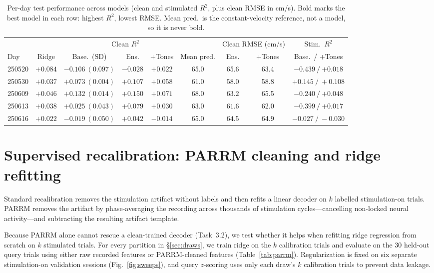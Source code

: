 \documentclass{article}
\begin{document}
\begin{table}[htbp]\centering
\caption{Per-day test performance across models (clean and stimulated $R^2$, plus clean RMSE in cm/s). Bold marks the best model in each row: highest $R^2$, lowest RMSE. Mean pred.\ is the constant-velocity reference, not a model, so it is never bold.}
\scriptsize
\setlength{\tabcolsep}{3pt}
\begin{tabular}{@{}lcccccccc@{}}\toprule
 & \multicolumn{5}{c}{Clean $R^2$} & \multicolumn{2}{c}{Clean RMSE (cm/s)} & Stim.\ $R^2$ \\
\cmidrule(lr){2-6}\cmidrule(lr){7-8}\cmidrule(lr){9-9}
Day & Ridge & Base.\ (SD) & Ens. & +Tones & Mean pred. & Ens. & +Tones & Base.\ / +Tones \\ \midrule
250520 & $\mathbf{+0.084}$ & $-0.106\ (0.097)$ & $-0.028$ & $+0.022$ & 65.0 & 65.6 & $\mathbf{63.4}$ & $-0.439\ /\ \mathbf{+0.018}$ \\
250530 & $+0.037$ & $+0.073\ (0.004)$ & $\mathbf{+0.107}$ & $+0.058$ & 61.0 & $\mathbf{58.0}$ & 58.8 & $\mathbf{+0.145}\ /\ +0.108$ \\
250609 & $+0.046$ & $+0.132\ (0.014)$ & $\mathbf{+0.150}$ & $+0.071$ & 68.0 & $\mathbf{63.2}$ & 65.5 & $-0.240\ /\ \mathbf{+0.048}$ \\
250613 & $+0.038$ & $+0.025\ (0.043)$ & $\mathbf{+0.079}$ & $+0.030$ & 63.0 & $\mathbf{61.6}$ & 62.0 & $-0.399\ /\ \mathbf{+0.017}$ \\
250616 & $+0.022$ & $-0.019\ (0.050)$ & $\mathbf{+0.042}$ & $-0.014$ & 65.0 & $\mathbf{64.5}$ & 64.9 & $\mathbf{-0.027}\ /\ -0.030$ \\
\bottomrule\end{tabular}\label{tab:perday}
\end{table}



\section{Supervised recalibration: PARRM cleaning and ridge refitting}\label{app:parrm}\label{sec:parrm}
Standard recalibration removes the stimulation artifact without labels and then refits a linear decoder on $k$ labelled stimulation-on trials. PARRM removes the artifact by phase-averaging the recording across thousands of stimulation cycles—cancelling non-locked neural activity—and subtracting the resulting artifact template.

Because PARRM alone cannot rescue a clean-trained decoder (Task~3.2), we test whether it helps when refitting ridge regression from scratch on $k$ stimulated trials. For every partition in \S\ref{sec:draws}, we train ridge on the $k$ calibration trials and evaluate on the 30 held-out query trials using either raw recorded features or PARRM-cleaned features (Table~\ref{tab:parrm}). Regularization is fixed on six separate stimulation-on validation sessions (Fig.~\ref{fig:sweeps}), and query $z$-scoring uses only each draw's $k$ calibration trials to prevent data leakage.
\end{document}
